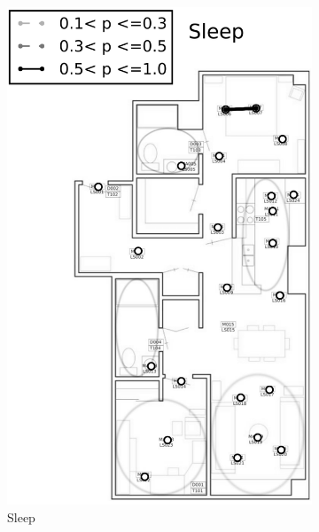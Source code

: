 \documentclass{article}
\begin{document}
\begin{figure}[!b]
\begin{subfigure}{0.32\linewidth}
    \includegraphics[width=\linewidth]{figures/visActs/Sleep_bw_cp}
    \caption{Sleep}
\end{subfigure}
\begin{subfigure}{0.32\linewidth}

\end{subfigure}
\end{figure}
\end{document}
